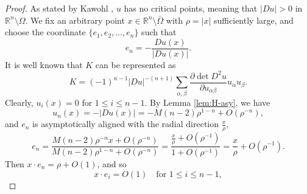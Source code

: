 \documentclass[reqno]{amsart}
\theoremstyle{remark}
\theoremstyle{definition}
\numberwithin{equation}{section}
\begin{document}
\begin{proof} 
	As stated by Kawohl \cite{Kawohl-1988}, $u$ has no critical points, meaning that $|Du|>0$ in $\mathbb{R}^n\setminus\Omega$.
	We fix an arbitrary point $x \in \mathbb{R}^n\setminus\bar{\Omega}$ with $\rho = |x|$ sufficiently large, and choose the coordinate $\{e_1, e_2, \dots, e_n\}$ such that
	$$e_n = -\frac{D u(x)}{|D u(x)|}.$$
	It is well known that $K$ can be represented as 
	\begin{equation}\label{eq:K}
		K = (-1)^{n-1} |Du|^{-(n+1)} \sum_{\alpha,\beta} \frac{\partial \det D^2 u}{\partial u_{\alpha\beta}} u_\alpha u_\beta.
	\end{equation}
	Clearly, $u_i(x) = 0$ for $1 \le i \le n-1$. By Lemma \ref{lem:H-asy}, we have
	$$u_n(x) = -|D u(x)| = -M(n-2)\rho^{1-n} + O(\rho^{-n}),$$
	and $e_n$ is asymptotically aligned with the radial direction $\frac{x}{\rho}$, 
	$$e_n = \frac{M(n-2)\rho^{-n}x+O(\rho^{-n})}{M(n-2)\rho^{1-n} + O(\rho^{-n})} = \frac{\frac{x}{\rho} + O(\rho^{-1})}{1 + O(\rho^{-1})}= \frac{x}{\rho} + O(\rho^{-1}).$$
	Then $x \cdot e_n = \rho + O(1)$, and so
	\begin{equation}\label{eq:x-i-proj}
		x \cdot e_i = O(1) \quad \text{for } 1 \le i \le n-1,
	\end{equation}
	

\end{proof}
\end{document}
